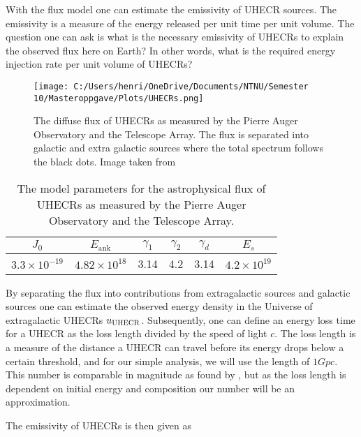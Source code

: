With the flux model one can estimate the emissivity of UHECR sources. The emissivity is a measure of the energy released per unit time per unit volume. The question one can ask is what is the necessary emissivity of UHECRs to explain the observed flux here on Earth? In other words, what is the required energy injection rate per unit volume of UHECRs?


\begin{figure}
    \centering
    \texttt{[image: C:/Users/henri/OneDrive/Documents/NTNU/Semester 10/Masteroppgave/Plots/UHECRs.png]}
    \caption{The diffuse flux of UHECRs as measured by the Pierre Auger Observatory and the Telescope Array. The flux is separated into galactic and extra galactic sources where the total spectrum follows the black dots. Image taken from \cite{Abdul_Halim_2023}}
    \label{fig:flux_UHECRs}
\end{figure}





\begin{table}
    \centering
    \begin{tabular}{|c|c|c|c|c|c|}
        \hline
        $J_0$ & $E_{\text{ank}}$ & $\gamma_1$ & $\gamma_2$ &$\gamma_d$& $E_s$\\
        \hline
        $3.3 \times 10^{-19} $ & $4.82\times 10^{18}$ & 3.14  & 4.2 & 3.14& $4.2 \times 10^{19}$  \\
        \hline
    \end{tabular}
    \caption{The model parameters for the astrophysical flux of UHECRs as measured by the Pierre Auger Observatory and the Telescope Array.}
    \label{tab:UHECR_flux}
\end{table}




By separating the flux into contributions from extragalactic sources and galactic sources one can estimate the observed energy density in the Universe of extragalactic UHECRs $u_{\rm UHECR}$. Subsequently, one can define an energy loss time for a UHECR as the loss length divided by the speed of light $c$.
The loss length is a measure of the distance a UHECR can travel before its energy drops below a certain threshold, and for our simple analysis, we will use the length of $1 Gpc$. This number is comparable in magnitude as found by \cite{Stanev_2009}, but as the loss length is dependent on initial energy and composition our number will be an approximation.

The emissivity of UHECRs is then given as

